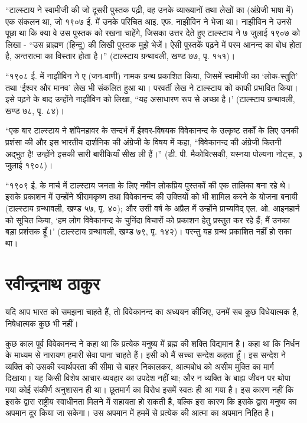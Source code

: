 “टाल्स्टाय ने स्वामीजी की जो दूसरी पुस्तक पढ़ी, वह उनके व्याख्यानों तथा लेखों का (अंग्रेजी भाषा में) एक संकलन था, जो १९०७ ई. में उनके परिचित आइ. एफ. नाझीविन ने भेजा था। नाझीविन ने उनसे पूछा था कि क्या वे उस पुस्तक को रखना चाहेंगे, जिसका उत्तर देते हुए टाल्स्टाय ने ७ जुलाई १९०७ को लिखा - “उस ब्राह्मण (हिन्दू) की लिखी पुस्तक मुझे भेजें। ऐसी पुस्तकें पढ़ने में परम आनन्द का बोध होता है, अन्तरात्मा का विस्तार होता है।” (टाल्स्टाय ग्रन्थावली, खण्ड ७७, पृ. १५१)। 

“१९०८ ई. में नाझीविन ने ए (जन-वाणी) नामक ग्रन्थ प्रकाशित किया, जिसमें स्वामीजी का ‘लोक-स्तुति’ तथा ‘ईश्वर और मानव’ लेख भी संकलित हुआ था। परवर्ती लेख ने टाल्स्टाय को काफी प्रभावित किया। इसे पढ़ने के बाद उन्होंने नाझीविन को लिखा, “यह असाधारण रूप से अच्छा है।’ (टाल्स्टाय ग्रन्थावली, खण्ड ७८, पृ. ८४)। 

“एक बार टाल्स्टाय ने शॉपेनहावर के सन्दर्भ में ईश्वर-विषयक विवेकानन्द के उत्कृष्ट तर्कों के लिए उनकी प्रशंसा की और इस भारतीय दार्शनिक की अंग्रेजी के विषय में कहा, “विवेकानन्द की अंग्रेजी कितनी अद्भुत है! उन्होंने इसकी सारी बारीकियाँ सीख ली हैं।” (डी. पी. मैकोवित्सकी, यस्नया पोल्यना नोट्स, ३ जुलाई १९०८)। 

“१९०९ ई. के मार्च में टाल्स्टाय जनता के लिए नवीन लोकप्रिय पुस्तकों की एक तालिका बना रहे थे। इसके प्रकाशन में उन्होंने श्रीरामकृष्ण तथा विवेकानन्द की उक्तियों को भी शामिल करने के योजना बनायी (टाल्स्टाय ग्रन्थावली, खण्ड ५७, पृ. ४०); और उसी वर्ष के अप्रैल में उन्होंने प्राच्यविद् एल. ओ. आइनहार्न को सूचित किया, ‘हम लोग विवेकानन्द के चुनिंदा विचारों को प्रकाशन हेतु प्रस्तुत कर रहे हैं; मैं उनका बड़ा प्रशंसक हूँ।’ (टाल्स्टाय ग्रन्थावली, खण्ड ७९, पृ. १४२)। परन्तु यह ग्रन्थ प्रकाशित नहीं हो सका था।


\section*{रवीन्द्रनाथ ठाकुर}


यदि आप भारत को समझना चाहते हैं, तो विवेकानन्द का अध्ययन कीजिए, उनमें सब कुछ विधेयात्मक है, निषेधात्मक कुछ भी नहीं। 

कुछ काल पूर्व विवेकानन्द ने कहा था कि प्रत्येक मनुष्य में ब्रह्म की शक्ति विद्यमान है। कहा था कि निर्धन के माध्यम से नारायण हमारी सेवा पाना चाहते हैं। इसी को मैं सच्चा सन्देश कहता हूँ। इस सन्देश ने व्यक्ति को उसकी स्वार्थपरता की सीमा से बाहर निकालकर, आत्मबोध को असीम मुक्ति का मार्ग दिखाया। यह किसी विशेष आचार-व्यवहार का उपदेश नहीं था; और न व्यक्ति के बाह्य जीवन पर थोपा गया कोई संकीर्ण अनुशासन ही था। छूतमार्ग का विरोध इसमें स्वतः ही आ गया है। इस कारण नहीं कि इसके द्वारा राष्ट्रीय स्वाधीनता मिलने में सहायता हो सकती है, बल्कि इस कारण कि इसके द्वारा मनुष्य का अपमान दूर किया जा सकेगा। उस अपमान में हममें से प्रत्येक की आत्मा का अपमान निहित है। 

